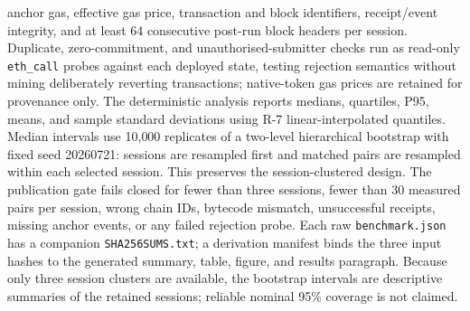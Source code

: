 \documentclass[journal]{IEEEtran}
\begin{document}
anchor gas, effective gas price, transaction and block identifiers,
receipt/event integrity, and at least 64 consecutive post-run block headers
per session. Duplicate, zero-commitment, and unauthorised-submitter checks run
as read-only \texttt{eth\_call} probes against each deployed state, testing
rejection semantics without mining deliberately reverting transactions;
native-token gas prices are retained for provenance only.
The deterministic analysis reports medians, quartiles, P95, means, and sample
standard deviations using R-7 linear-interpolated quantiles. Median intervals
use 10{,}000 replicates of a two-level hierarchical bootstrap with fixed seed
20260721: sessions are resampled first and matched pairs are resampled within
each selected session. This preserves the session-clustered design. The
publication gate fails closed for fewer than three sessions, fewer than 30
measured pairs per session, wrong chain IDs, bytecode mismatch, unsuccessful
receipts, missing anchor events, or any failed rejection probe. Each raw
\texttt{benchmark.json} has a companion \texttt{SHA256SUMS.txt}; a derivation
manifest binds the three input hashes to the generated summary, table, figure,
and results paragraph.
Because only three session clusters are available, the bootstrap intervals are
descriptive summaries of the retained sessions; reliable nominal 95\%
coverage is not claimed.
\end{document}
